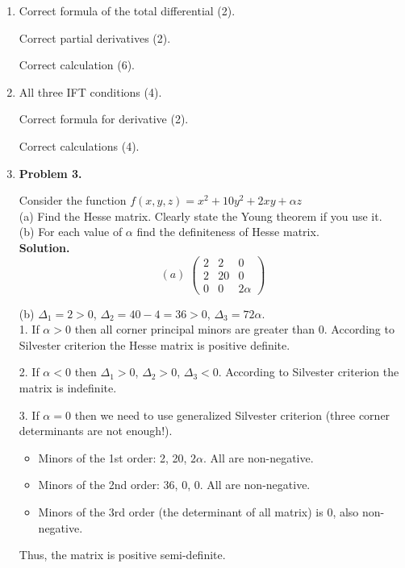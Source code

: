 \begin{enumerate}
  \item Correct formula of the total differential (2).

Correct partial derivatives (2).

Correct calculation (6).

  \item All three IFT conditions (4).

Correct formula for derivative (2).

Correct calculations (4).

  \item \textbf{Problem 3.}

  Consider the function $f(x,y,z)=x^2+10y^2+2xy+\alpha z$\\
  (a) Find the Hesse matrix. Clearly state the Young theorem if you use it.\\
  (b) For each value of $\alpha$ find the definiteness of Hesse matrix.\\

  \textbf{Solution.}
   $$(a)\; \begin{pmatrix}
  2& 2 &0\\
  2 &20& 0\\
  0& 0& 2\alpha
  \end{pmatrix}$$

  (b) $\Delta_1=2>0$, $\Delta_2=40-4=36>0$, $\Delta_3=72\alpha$.\\
  1. If $\alpha >0$ then all corner principal minors are greater than 0. According to Silvester criterion the Hesse matrix is positive definite.

  2. If $\alpha<0$ then $\Delta_1>0$, $\Delta_2>0$, $\Delta_3<0$. According to Silvester criterion the matrix is indefinite.

  3. If $\alpha=0$ then we need to use generalized Silvester criterion (three corner determinants are not enough!).

  \begin{itemize}
  \item Minors of the 1st order: 2, 20, $2\alpha$. All are non-negative.
  \item Minors of the 2nd order: 36, 0, 0. All are non-negative.
  \item Minors of the 3rd order (the determinant of all matrix) is 0, also non-negative.
  \end{itemize}

  Thus, the matrix is positive semi-definite.
  \smallskip


\end{enumerate}
